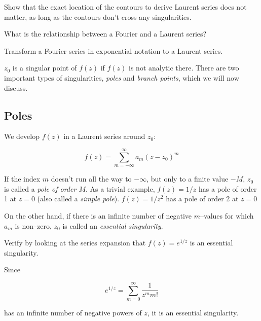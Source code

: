 \begin{exer}
  Show that the exact location of the contours to derive Laurent series does not matter, as long as the contours don't cross any singularities.

\end{exer}

\begin{exer}
  What is the relationship between a Fourier and a Laurent series?
  \begin{hnt}
  Transform a Fourier series in exponential notation to a Laurent series.
  \end{hnt}
\end{exer}


\pagebreak



$z_0$ is a singular point of $f(z)$ if $f(z)$ is not analytic there. There are two important types of singularities, \emph{poles} and \emph{branch points}, which we will now discuss.

\subsection*{Poles}

We develop $f(z)$ in a Laurent series around $z_0$:

\begin{equation}
f(z)= \sum_{m=-\infty}^{\infty} a_m (z-z_0)^m
\end{equation} 

If the index $m$ doesn't run all the way to $-\infty$, but only to a finite value $-M$, $z_0$ is called a \emph{pole of order $M$}. As a trivial example, $f(z)=1/z$ has a pole of order 1 at $z=0$ (also called a \emph{simple pole}). $f(z)=1/z^2$ has a pole of order 2 at $z=0$

On the other hand, if there is an infinite number of negative $m$--values for which $a_m$ is non--zero, $z_0$ is called an \emph{essential singularity}.

\begin{cue}
  Verify by looking at the series expansion that $f(z)=e^{1/z}$ is an essential singularity.  
\end{cue}

Since

$$e^{1/z} = \sum_{m=0}^{\infty} \frac{1}{z^m m!} $$

has an infinite number of negative powers of $z$, it is an essential singularity.

